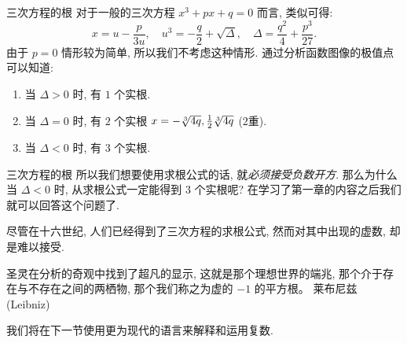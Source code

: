 \begin{frame}{三次方程的根\noexer}
	\onslide<+->
	对于一般的三次方程 $x^3+px+q=0$ 而言, 类似可得:
		\[x=u-\frac p{3u},\quad u^3=-\frac q2+\sqrt{\Delta},\quad \Delta=\frac{q^2}4+\frac{p^3}{27}.\]
	\onslide<+->
	由于 $p=0$ 情形较为简单, 所以我们不考虑这种情形.
	\onslide<+->
	通过分析函数图像的极值点可以知道:
	\begin{enumerate}
		\item 当 $\Delta>0$ 时, 有 $1$ 个实根.
		\item 当 $\Delta=0$ 时, 有 $2$ 个实根 $x=-\sqrt[3]{4q},\frac{1}{2}\sqrt[3]{4q}$ ($2$重).
		\item 当 $\Delta<0$ 时, 有 $3$ 个实根.
	\end{enumerate}
	\begin{center}
	\end{center}
\end{frame}


\begin{frame}{三次方程的根\noexer}
	\onslide<+->
	所以我们想要使用求根公式的话, 就\emph{必须接受负数开方}.
	\onslide<+->
	那么为什么当 $\Delta<0$ 时, 从求根公式一定能得到 $3$ 个实根呢?
	\onslide<+->
	在学习了第一章的内容之后我们就可以回答这个问题了.

	\onslide<+->
	尽管在十六世纪, 人们已经得到了三次方程的求根公式, 然而对其中出现的虚数, 却是难以接受.

	\onslide<+->
	\begin{quote@*}
		圣灵在分析的奇观中找到了超凡的显示, 这就是那个理想世界的端兆, 那个介于存在与不存在之间的两栖物, 那个我们称之为虚的 $-1$ 的平方根。
	\tcblower
	莱布尼兹 (Leibniz)
	\end{quote@*}

	\onslide<+->
	我们将在下一节使用更为现代的语言来解释和运用复数.
\end{frame}
